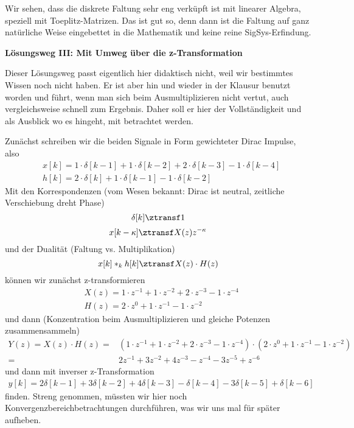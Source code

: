 Wir sehen, dass die diskrete Faltung sehr eng verküpft ist mit linearer Algebra, speziell
mit Toeplitz-Matrizen. Das ist gut so, denn dann ist die Faltung auf ganz natürliche Weise
eingebettet in die Mathematik und keine reine SigSys-Erfindung.

\newpage
\noindent\textbf{Lösungsweg III: Mit Umweg über die z-Transformation}

\noindent Dieser Lösungsweg passt eigentlich hier didaktisch nicht, weil wir bestimmtes
Wissen noch nicht haben.
Er ist aber hin und wieder in der Klausur benutzt worden und führt, wenn man sich
beim Ausmultiplizieren nicht vertut, auch vergleichsweise schnell zum Ergebnis.
Daher soll er hier der Vollständigkeit und als Ausblick wo es hingeht, mit betrachtet werden.

Zunächst schreiben wir die beiden Signale in Form gewichteter Dirac Impulse, also
%
\begin{align}
&x[k] = 1 \cdot \delta[k-1] + 1 \cdot \delta[k-2] + 2 \cdot \delta[k-3]  - 1 \cdot \delta[k-4]\\
&h[k] = 2 \cdot \delta[k] + 1 \cdot \delta[k-1] - 1 \cdot \delta[k-2]
\end{align}
%
Mit den Korrespondenzen (vom Wesen bekannt: Dirac ist neutral,
zeitliche Verschiebung dreht Phase)
$$\delta[k] \ztransf 1$$
$$x[k - \kappa] \ztransf X(z) z^{-\kappa}$$
und der Dualität (Faltung vs. Multiplikation)
$$x[k] \ast_k h[k] \ztransf X(z) \cdot H(z)$$
können wir zunächst z-transformieren
\begin{align}
&X(z) = 1 \cdot z^{-1} + 1 \cdot z^{-2} + 2 \cdot z^{-3}  - 1 \cdot z^{-4}\\
&H(z) = 2 \cdot z^{0} + 1 \cdot z^{-1} - 1 \cdot z^{-2}
\end{align}
und dann (Konzentration beim Ausmultiplizieren und gleiche Potenzen zusammensammeln)
\begin{align}
Y(z) = X(z)\cdot H(z) =
&(1 \cdot z^{-1} + 1 \cdot z^{-2} + 2 \cdot z^{-3}  - 1 \cdot z^{-4}) \cdot
(2 \cdot z^{0} + 1 \cdot z^{-1} - 1 \cdot z^{-2})\\
=
&2  z^{-1} + 3 z^{-2} + 4 z^{-3} - z^{-4} - 3 z^{-5} + z^{-6}
\end{align}
und dann mit inverser z-Transformation
\begin{align}
y[k] =
2  \delta[k-1] + 3 \delta[k-2] + 4 \delta[k-3] - \delta[k-4] - 3 \delta[k-5] + \delta[k-6]
\end{align}
finden.
Streng genommen, müssten wir hier noch Konvergenzbereichbetrachtungen durchführen,
was wir uns mal für später aufheben.


